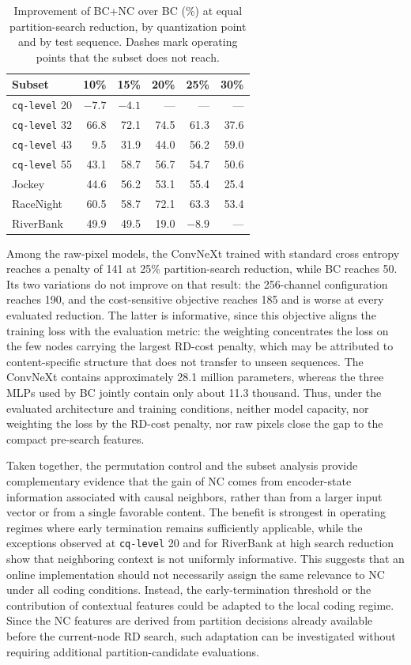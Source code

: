 \documentclass{article}
\begin{document}
\begin{table}[t]
\caption{Improvement of BC+NC over BC (\%) at equal partition-search reduction, by quantization point and by test sequence. Dashes mark operating points that the subset does not reach.}
\label{tab:slices}
\centering
\setlength{\tabcolsep}{3.6pt}
\begin{tabular}{lrrrrr}
\hline
\textbf{Subset} & \textbf{10\%} & \textbf{15\%} & \textbf{20\%}
& \textbf{25\%} & \textbf{30\%} \\
\hline
\texttt{cq-level} 20 & $-7.7$ & $-4.1$ & --- & --- & --- \\
\texttt{cq-level} 32 & 66.8 & 72.1 & 74.5 & 61.3 & 37.6 \\
\texttt{cq-level} 43 & 9.5 & 31.9 & 44.0 & 56.2 & 59.0 \\
\texttt{cq-level} 55 & 43.1 & 58.7 & 56.7 & 54.7 & 50.6 \\
\hline
Jockey & 44.6 & 56.2 & 53.1 & 55.4 & 25.4 \\
RaceNight & 60.5 & 58.7 & 72.1 & 63.3 & 53.4 \\
RiverBank & 49.9 & 49.5 & 19.0 & $-8.9$ & --- \\
\hline
\end{tabular}
\end{table}

Among the raw-pixel models, the ConvNeXt trained with standard cross entropy reaches a penalty of 141 at 25\% partition-search reduction, while BC reaches 50. Its two variations do not improve on that result: the 256-channel configuration reaches 190, and the cost-sensitive objective reaches 185 and is worse at every evaluated reduction. The latter is informative, since this objective aligns the training loss with the evaluation metric: the weighting concentrates the loss on the few nodes carrying the largest RD-cost penalty, which may be attributed to content-specific structure that does not transfer to unseen sequences. The ConvNeXt contains approximately 28.1 million parameters, whereas the three MLPs used by BC jointly contain only about 11.3 thousand. Thus, under the evaluated architecture and training conditions, neither model capacity, nor weighting the loss by the RD-cost penalty, nor raw pixels close the gap to the compact pre-search features.

Taken together, the permutation control and the subset analysis provide complementary evidence that the gain of NC comes from encoder-state information associated with causal neighbors, rather than from a larger input vector or from a single favorable content. 
The benefit is strongest in operating regimes where early termination remains sufficiently applicable, while the exceptions observed at \texttt{cq-level} 20 and for RiverBank at high search reduction show that neighboring context is not uniformly informative. 
This suggests that an online implementation should not necessarily assign the same relevance to NC under all coding conditions.
Instead, the early-termination threshold or the contribution of contextual features could be adapted to the local coding regime. 
Since the NC features are derived from partition decisions already available before the current-node RD search, such adaptation can be investigated without requiring additional partition-candidate evaluations.
\end{document}
